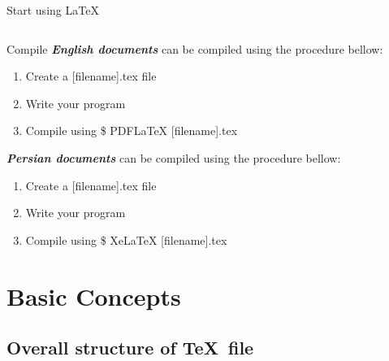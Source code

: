 \documentclass[10pt,xcolor={dvipsnames}]{beamer}
\begin{document}
\begin{frame}{Start using \LaTeX}
\begin{columns}[T]
 			\end{columns}	
 			
 		\end{frame}
 	
 		\begin{frame}{Compile}
 			\onslide<2->
 			\textbf{\textit{English documents}} can be compiled using the procedure bellow:
 			\begin{enumerate}
 				\item<3-> Create a {\color{blue}[filename].tex} file
 				\item<4-> Write your program
 				\item<5-> Compile using {\color{red}\$} PDFLaTeX {\color{blue}[filename].tex}
	 		\end{enumerate}
 			
 			\vspace{1cm}
 			
 			\textbf{\textit{Persian documents}} can be compiled using the procedure bellow:
 			\begin{enumerate}
 				\item<7-> Create a {\color{blue}[filename].tex} file
 				\item<8-> Write your program
 				\item<9-> Compile using {\color{red}\$} XeLaTeX {\color{blue}[filename].tex}
 			\end{enumerate}
	 	\end{frame}
 		

\section{Basic Concepts}
	\begin{frame}
	\end{frame}

	\subsection{Overall structure of \TeX ~file}
	
\end{document}
